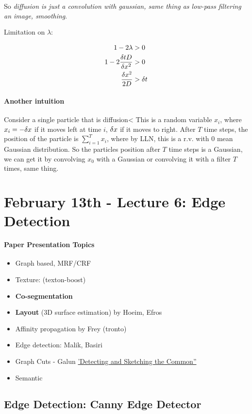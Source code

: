 So \emph{diffusion is just a convolution with gaussian, same thing as
low-pass filtering an image, smoothing}.

Limitation on $\lambda$:  

\begin{align*}
  1 - 2\lambda &> 0\\
1 - 2\frac{\delta t D}{\delta x^2} &> 0\\
\frac{\delta x^2}{2D} &> \delta t 
\end{align*}

\paragraph{Another intuition}
Consider a single particle that is diffusion< This
is a random variable $x_i$, where $x_i = -\delta x$ if it moves left at
time $i$, $\delta x$ if it moves to right. After $T$ time steps, the
position of the particle is $\sum_{i=1}^T x_i$, where by LLN, this is
a r.v. with 0 mean Gaussian distribution. So the particles position
after $T$ time steps is a Gaussian, we can get it by convolving $x_0$
with a Gaussian or convolving it with a filter $T$ times, same thing.


\pagebreak
\section{February 13th - Lecture 6: Edge Detection}
\label{sec:lecture-6}

\paragraph{Paper Presentation Topics}
\begin{itemize}
\item Graph based, MRF/CRF
\item Texture: (texton-boost)
\item \textbf{Co-segmentation}
\item \textbf{Layout} (3D surface estimation) by Hoeim, Efros
\item Affinity propagation by Frey (tronto)
\item Edge detection: Malik, Basiri
\item Graph Cuts - Galun \href{''http://www.wisdom.weizmann.ac.il/~vision/SketchTheCommon/''}{'Detecting and Sketching the Common''} 
\item Semantic
\end{itemize}

\subsection{Edge Detection: Canny Edge Detector}
\label{sec:edge-detection}

